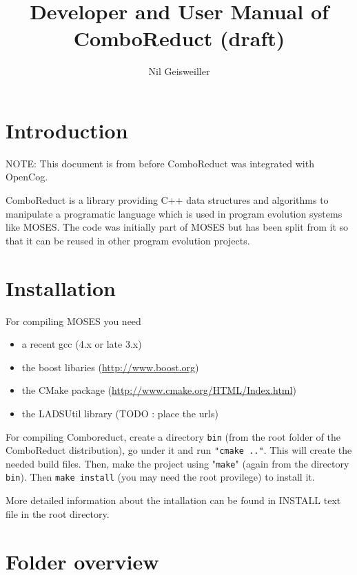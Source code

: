 \documentclass{article}
\title{Developer and User Manual of ComboReduct (draft)}
\author{Nil Geisweiller}
\begin{document}
  
  \maketitle
  
  \tableofcontents
  
  \newpage
  
  \section{Introduction}
  
  NOTE: This document is from before ComboReduct was integrated with OpenCog.

  ComboReduct is a library providing C++ data structures and algorithms 
  to manipulate a programatic language which is used in program evolution 
  systems like MOSES. The code was initially part of MOSES but has
  been split from it so that it can be reused in other program evolution projects.
  
  \section{Installation}
  
  For compiling MOSES you need
  \begin{itemize}
  \item a recent gcc (4.x or late 3.x)
  \item the boost libaries (\url{http://www.boost.org})
  \item the CMake package (\url{http://www.cmake.org/HTML/Index.html})
  \item the LADSUtil library (TODO : place the urls)
  \end{itemize}
  
  For compiling Comboreduct, create a directory \verb|bin|
  (from the root folder of the ComboReduct distribution), go under it
  and run \verb|"cmake .."|. This will create 
  the needed build files. Then, make the project using "\verb|make|" (again 
  from the directory \verb|bin|). Then \verb|make install| (you may need the
  root provilege) to install it.
  
  More detailed information about the intallation can be found in INSTALL text
  file in the root directory.

  \section{Folder overview}
\end{document}
